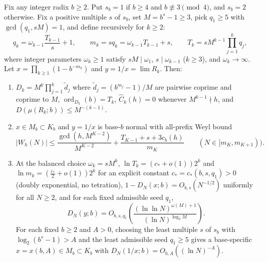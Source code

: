 \documentclass[11pt]{article}
\DeclareMathOperator{\ord}{ord}
\begin{document}
\begin{theorem}\label{thm:anchored-coprime}
Fix any integer radix $b\ge2$. Put $s_b=1$ if $b\ge4$ and $b\not\equiv3\pmod4$, and $s_b=2$ otherwise. Fix a positive multiple $s$ of $s_b$, set $M=b^s-1\ge3$, pick $q_1\ge5$ with $\gcd(q_1,sM)=1$, and define recursively for $k\ge2$:
\[
q_k=\omega_{k-1}\frac{T_{k-1}}{s}+1,\qquad m_k=sq_k=\omega_{k-1}T_{k-1}+s,\qquad T_k=sM^{k-1}\prod_{j=1}^k q_j,
\]
where integer parameters $\omega_k\ge1$ satisfy $sM\mid\omega_1$, $s\mid\omega_{k-1}$ ($k\ge3$), and $\omega_k\to\infty$. Let $x=\prod_{k\ge1}(1-b^{-m_k})$ and $y=1/x=\lim R_k$. Then:
\begin{enumerate}[label=\textup{(\roman*)},nosep]
\item $D_k=M^k\prod_{j=1}^k\widetilde d_j$ where $\widetilde d_j=(b^{m_j}-1)/M$ are pairwise coprime and coprime to $M$, $\ord_{D_k}(b)=T_k$, $\widehat C_k(h)=0$ whenever $M^{k-1}\nmid h$, and $D(\mu(R_k;b))\le M^{-(k-1)}$.
\item $x\in M_b\subset K_b$ and $y=1/x$ is base-$b$ normal with all-prefix Weyl bound
\[
|W_h(N)|\le\frac{\gcd(h,M^{K-2})}{M^{K-2}}+\frac{T_{K-1}+s+3c_b(h)}{m_K}\qquad(N\in[m_K,m_{K+1})).
\]
\item At the balanced choice $\omega_k=sM^k$, $\ln T_k=(c_*+o(1))2^k$ and $\ln m_k=(\frac{c_*}{2}+o(1))2^k$ for an explicit constant $c_*=c_*(b,s,q_1)>0$ (doubly exponential, no tetration), $1-D_N(x;b)=O_{b,s}(N^{-1/2})$ uniformly for all $N\ge2$, and for each fixed admissible seed $q_1$,
\[
D_N(y;b)=O_{b,s,q_1}\!\left(\frac{(\ln\ln N)^{\omega(M)+1}}{(\ln N)^{\log_2 M}}\right).
\]
For each fixed $b\ge2$ and $A>0$, choosing the least multiple $s$ of $s_b$ with $\log_2(b^s-1)>A$ and the least admissible seed $q_1\ge5$ gives a base-specific $x=x(b,A)\in M_b\subset K_b$ with $D_N(1/x;b)=O_{b,A}((\ln N)^{-A})$.
\end{enumerate}
\end{theorem}
\end{document}
